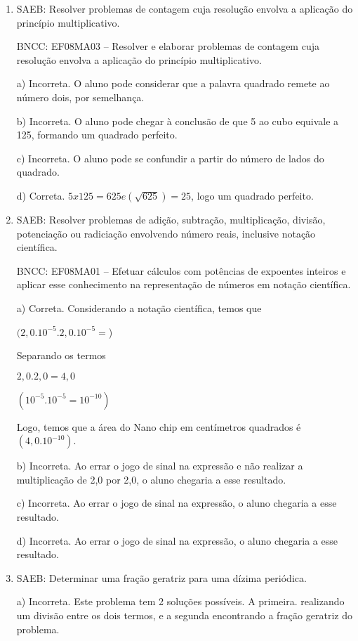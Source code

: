 \begin{enumerate}
\item SAEB: Resolver problemas de contagem cuja resolução envolva a aplicação
do princípio multiplicativo.

BNCC: EF08MA03 -- Resolver e elaborar problemas de contagem cuja
resolução envolva a aplicação do princípio multiplicativo.

a) Incorreta. O aluno pode considerar que a palavra quadrado remete
ao número dois, por semelhança.

b) Incorreta. O aluno pode chegar à conclusão de que 5 ao cubo equivale a
125, formando um quadrado perfeito.

c) Incorreta. O aluno pode se confundir a partir do número de lados
do quadrado.

d) Correta. $5 x 125 = 625 e (\sqrt{625}) = 25$, logo um quadrado
perfeito.

\item SAEB: Resolver problemas de adição, subtração, multiplicação, divisão,
potenciação ou radiciação envolvendo número reais, inclusive notação
científica.

BNCC: EF08MA01 -- Efetuar cálculos com potências de expoentes inteiros e
aplicar esse conhecimento na representação de números em notação
científica.

a) Correta. Considerando a notação científica, temos que

$(2,0 . 10^{-5} . 2,0 . 10^{-5} =$)

Separando os termos

$2,0 . 2,0 = 4,0$

$(10^{-5} . 10^{-5} = 10^{-10})$

Logo, temos que a área do Nano chip em centímetros quadrados é $(4,0 . 10^{-10})$.

b) Incorreta. Ao errar o jogo de sinal na expressão e não realizar
a multiplicação de 2,0 por 2,0, o aluno chegaria a esse resultado.

c) Incorreta. Ao errar o jogo de sinal na expressão, o aluno
chegaria a esse resultado.

d) Incorreta. Ao errar o jogo de sinal na expressão, o aluno
chegaria a esse resultado.
\item SAEB: Determinar uma fração geratriz para uma dízima periódica.

a) Incorreta. Este problema tem 2 soluções possíveis. A primeira.
realizando um divisão entre os dois termos, e a segunda encontrando a
fração geratriz do problema.


\end{enumerate}
